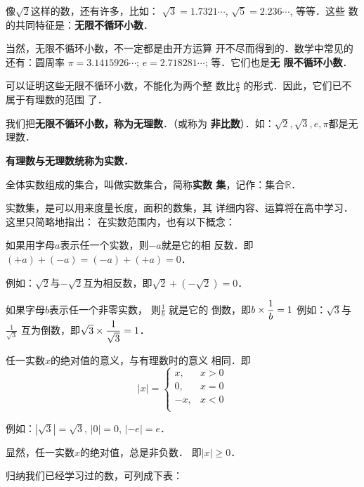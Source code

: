 像$\sqrt{2}$这样的数，还有许多，比如：
$\sqrt{3}=1.7321\cdots$, $\sqrt{5}=2.236\cdots$, 等等．这些
数的共同特征是：\textbf{无限不循环小数}．

当然，无限不循环小数，不一定都是由开方运算
开不尽而得到的．数学中常见的还有：圆周率
$\pi=3.1415926\cdots$; $e=2.718281\cdots$; 等．它们也是\textbf{无
限不循环小数}．

可以证明这些无限不循环小数，不能化为两个整
数比$\frac{a}{b}$
的形式．因此，它们已不属于有理数的范围
了．

我们把\textbf{无限不循环小数，称为无理数}．（或称为
\textbf{非比数}）．如：$\sqrt{2},\sqrt{3},e,\pi$都是无理数．

\textbf{有理数与无理数统称为实数．}

全体实数组成的集合，叫做实数集合，简称\textbf{实数
集}，记作：集合$\mathbb{R}$．

实数集，是可以用来度量长度，面积的数集，其
详细内容、运算将在高中学习．这里只简略地指出：
在实数范围内，也有以下概念：

如果用字母$a$表示任一个实数，则$-a$就是它的相
反数．即$(+a)+(-a)=(-a)+(+a)=0$．

例如：$\sqrt{2}$与$-\sqrt{2}$互为相反数，即$\sqrt{2}+\left(-\sqrt{2}\right)=0$．

如果字母$b$表示任一个非零实数，
则$\frac{1}{b}$
就是它的
倒数，即$b\times\dfrac{1}{b}=1$
例如：$\sqrt{3}$与$\frac{1}{\sqrt{3}}$
互为倒数，即$\sqrt{3}\times \dfrac{1}{\sqrt{3}}=1$．

任一实数$x$的绝对值的意义，与有理数时的意义
相同．即
\[|x|=\begin{cases}
    x, & x>0\\
    0, & x=0\\
    -x, & x<0\\  
\end{cases}\]

例如：$|\sqrt{3}|=\sqrt{3}$, $|0|=0$, $|-e|=e$．

显然，任一实数$x$的绝对值，总是非负数．
即$|x|\ge 0$．

归纳我们已经学习过的数，可列成下表：

\begin{center}
\end{center}




